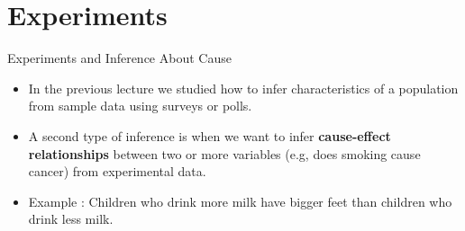 \documentclass[handout]{beamer}
\begin{document}
\section{Experiments}

\begin{frame}{Experiments and Inference About Cause}
\scriptsize{
\begin{itemize}
 \item In the previous lecture we studied how to infer characteristics of a population from sample data using surveys or polls.
 \item A second type of inference is when we want to infer \textbf{cause-effect relationships} between two or more variables (e.g, does smoking cause cancer) from experimental data. 
 \item Example \cite{watkins2010statistics}: Children who drink more milk have bigger feet than children who drink less milk. 
 
 
\end{itemize}






} 
\end{frame}
\end{document}
